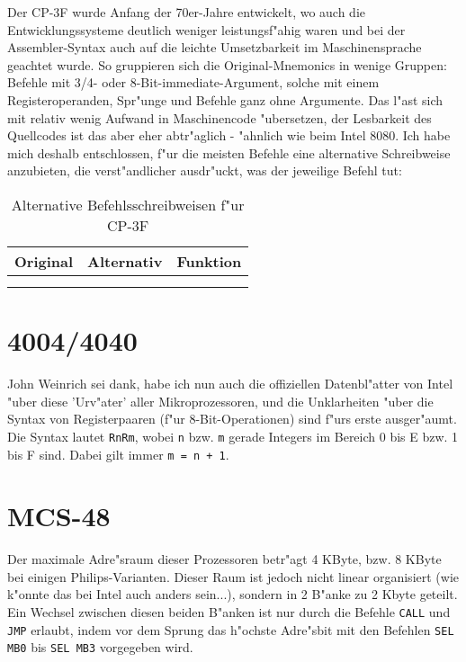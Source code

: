 \documentclass[12pt,a4paper,twoside]{report}
\newcommand{\tty}[1]{{\tt #1}}
\begin{document}
Der CP-3F wurde Anfang der 70er-Jahre entwickelt, wo auch die Entwicklungssysteme
deutlich weniger leistungsf"ahig waren und bei der Assembler-Syntax auch
auf die leichte Umsetzbarkeit im Maschinensprache geachtet wurde.  So
gruppieren sich die Original-Mnemonics in wenige Gruppen: Befehle mit
3/4- oder 8-Bit-immediate-Argument, solche mit einem Registeroperanden,
Spr"unge und Befehle ganz ohne Argumente.  Das l"ast sich mit relativ wenig
Aufwand in Maschinencode "ubersetzen, der Lesbarkeit des Quellcodes
ist das aber eher abtr"aglich - "ahnlich wie beim Intel 8080.  Ich habe mich
deshalb entschlossen, f"ur die meisten Befehle eine alternative Schreibweise
anzubieten, die verst"andlicher ausdr"uckt, was der jeweilige Befehl
tut:

\begin{longtable}{|l|l|l|}
\hline
Original & Alternativ & Funktion \\
\hline
\hline
\endhead

\\ \hline
\caption{Alternative Befehlsschreibweisen f"ur CP-3F}
\label{CP3FInst}
\end{longtable}


\section{4004/4040}

John Weinrich sei dank, habe ich nun auch die offiziellen Datenbl"atter
von Intel "uber diese 'Urv"ater' aller Mikroprozessoren, und die
Unklarheiten "uber die Syntax von Registerpaaren (f"ur 8-Bit-Operationen)
sind f"urs erste ausger"aumt.  Die Syntax lautet \tty{RnRm}, wobei \tty{n}
bzw. \tty{m} gerade Integers im Bereich 0 bis E bzw. 1 bis F sind.  Dabei
gilt immer \tty{m = n + 1}.


\section{MCS-48}

Der maximale Adre"sraum dieser Prozessoren betr"agt 4 KByte, bzw. 8 KByte
bei einigen Philips-Varianten.  Dieser Raum ist jedoch nicht linear organisiert
(wie k"onnte das bei Intel auch anders sein...), sondern in 2 B"anke zu 2
Kbyte geteilt.  Ein Wechsel zwischen diesen beiden B"anken ist nur durch die
Befehle \tty{CALL} und \tty{JMP} erlaubt, indem vor dem Sprung das h"ochste
Adre"sbit mit den Befehlen \tty{SEL MB0} bis \tty{SEL MB3} vorgegeben wird.
\end{document}
